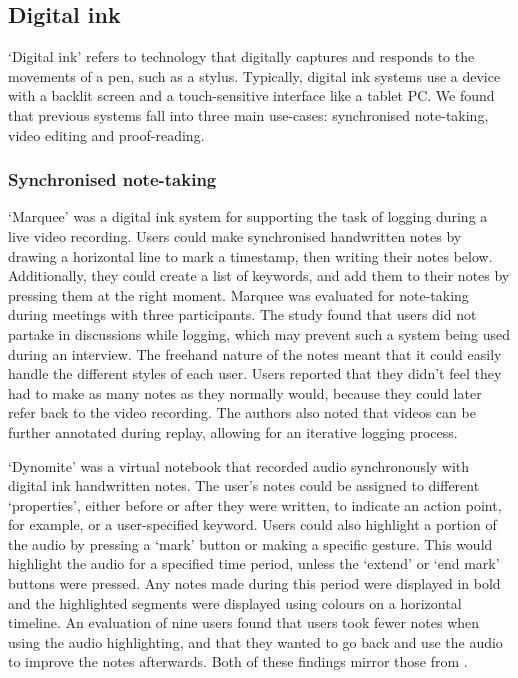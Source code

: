 \subsection{Digital ink}
`Digital ink' refers to technology that digitally captures and responds to the movements of a pen, such as a stylus.
Typically, digital ink systems use a device with a backlit screen and a touch-sensitive interface like a tablet PC.
We found that previous systems fall into three main use-cases: synchronised note-taking, video editing and
proof-reading.

\subsubsection{Synchronised note-taking}
`Marquee' \citep{Weher1994} was a digital ink system for supporting the task of logging during a live video recording.
Users could make synchronised handwritten notes by drawing a horizontal line to mark a timestamp, then writing their
notes below.  Additionally, they could create a list of keywords, and add them to their notes by pressing them at the
right moment.  Marquee was evaluated for note-taking during meetings with three participants. The study found that
users did not partake in discussions while logging, which may prevent such a system being used during an interview.
The freehand nature of the notes meant that it could easily handle the different styles of each user.  Users reported
that they didn't feel they had to make as many notes as they normally would, because they could later refer back to the
video recording. The authors also noted that videos can be further annotated during replay, allowing for an iterative
logging process.

`Dynomite' \citep{Wilcox1997} was a virtual notebook that recorded audio synchronously with digital ink handwritten
notes. The user's notes could be assigned to different `properties', either before or after they were written, to
indicate an action point, for example, or a user-specified keyword.  Users could also highlight a portion of the audio
by pressing a `mark' button or making a specific gesture.  This would highlight the audio for a specified time period,
unless the `extend' or `end mark' buttons were pressed.  Any notes made during this period were displayed in bold and
the highlighted segments were displayed using colours on a horizontal timeline. An evaluation of nine users found that
users took fewer notes when using the audio highlighting, and that they wanted to go back and use the audio to improve
the notes afterwards. Both of these findings mirror those from \citet{Weher1994}.

